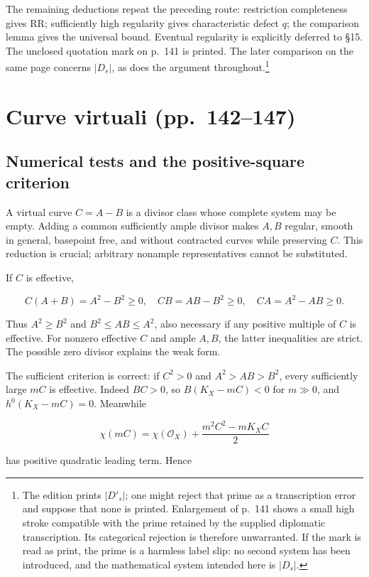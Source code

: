 The remaining deductions repeat the preceding route: restriction completeness gives RR; sufficiently high regularity gives characteristic defect \(q\); the comparison lemma gives the universal bound. Eventual regularity is explicitly deferred to §15. The unclosed quotation mark on p.~141 is printed. The later comparison on the same page concerns \(|D_s|\), as does the argument throughout.\footnote{The edition prints \(|D'_s|\); one might reject that prime as a transcription error and suppose that none is printed. Enlargement of p.~141 shows a small high stroke compatible with the prime retained by the supplied diplomatic transcription. Its categorical rejection is therefore unwarranted. If the mark is read as print, the prime is a harmless label slip: no second system has been introduced, and the mathematical system intended here is \(|D_s|\).}

\section[Curve virtuali]{Curve virtuali (pp.~142--147)}\label{enriques-iv-14}

\subsection{Numerical tests and the positive-square criterion}

A virtual curve \(C=A-B\) is a divisor class whose complete system may be empty. Adding a common sufficiently ample divisor makes \(A,B\) regular, smooth in general, basepoint free, and without contracted curves while preserving \(C\). This reduction is crucial; arbitrary nonample representatives cannot be substituted.

If \(C\) is effective,

\[
C(A+B)=A^2-B^2\ge0,\quad
CB=AB-B^2\ge0,\quad CA=A^2-AB\ge0.
\]

Thus \(A^2\ge B^2\) and \(B^2\le AB\le A^2\), also necessary if any positive multiple of \(C\) is effective. For nonzero effective \(C\) and ample \(A,B\), the latter inequalities are strict. The possible zero divisor explains the weak form.

The sufficient criterion is correct: if \(C^2>0\) and \(A^2>AB>B^2\), every sufficiently large \(mC\) is effective. Indeed \(BC>0\), so \(B(K_X-mC)<0\) for \(m\gg0\), and \(h^0(K_X-mC)=0\). Meanwhile

\[
\chi(mC)=\chi(\mathcal O_X)+\frac{m^2C^2-mK_X C}{2}
\]

has positive quadratic leading term. Hence

